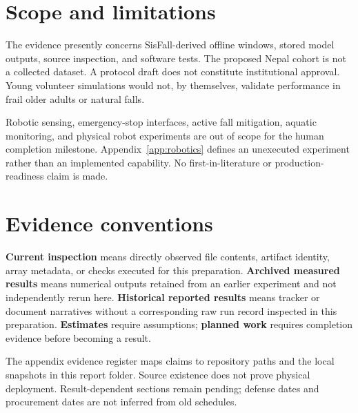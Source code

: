 \section{Scope and limitations}
The evidence presently concerns SisFall-derived offline windows, stored model outputs, source inspection, and software tests. The proposed Nepal cohort is not a collected dataset. A protocol draft does not constitute institutional approval. Young volunteer simulations would not, by themselves, validate performance in frail older adults or natural falls.

Robotic sensing, emergency-stop interfaces, active fall mitigation, aquatic monitoring, and physical robot experiments are out of scope for the human completion milestone. Appendix~\ref{app:robotics} defines an unexecuted experiment rather than an implemented capability. No first-in-literature or production-readiness claim is made.

\section{Evidence conventions}
\textbf{Current inspection} means directly observed file contents, artifact identity, array metadata, or checks executed for this preparation. \textbf{Archived measured results} means numerical outputs retained from an earlier experiment and not independently rerun here. \textbf{Historical reported results} means tracker or document narratives without a corresponding raw run record inspected in this preparation. \textbf{Estimates} require assumptions; \textbf{planned work} requires completion evidence before becoming a result.

The appendix evidence register maps claims to repository paths and the local snapshots in this report folder. Source existence does not prove physical deployment. Result-dependent sections remain pending; defense dates and procurement dates are not inferred from old schedules.
